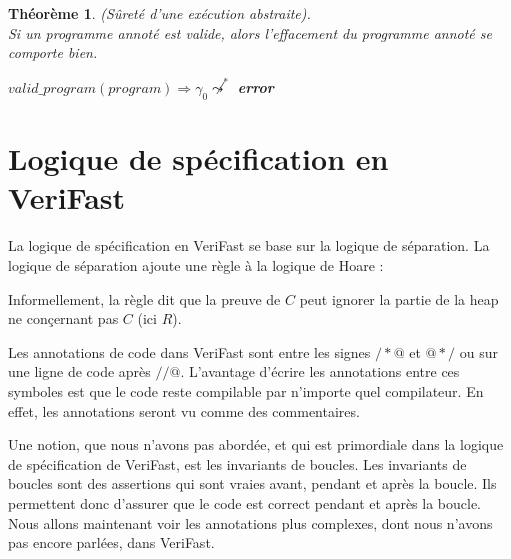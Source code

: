 \documentclass[9pt,openany]{book}
\newcommand{\verifast}{VeriFast}
\newtheorem{theorem}{Th\'eor\`eme}
\begin{document}
		\begin{theorem}
			(S\^uret\'e d'une ex\'ecution abstraite).\\
			Si un programme annot\'e est valide, alors l'effacement du programme annot\'e se comporte bien.
			\begin{center}
			$valid\_program(program)\Rightarrow\gamma_0 \not\leadsto^*$ \textbf{error}
			\end{center}
		\end{theorem}
	
		
	\section{Logique de sp\'ecification en \verifast{}}
		La logique de sp\'ecification en \verifast{} se base sur la logique de s\'eparation. La logique de s\'eparation ajoute une r\`egle \`a la logique de Hoare :
		\begin{center}
		


		\end{center}
		Informellement, la r\`egle dit que la preuve de $C$ peut ignorer la partie de la heap ne con\c{c}ernant pas $C$ (ici $R$).\par
		Les annotations de code dans \verifast{} sont entre les signes $/*@$ et $@*/$ ou sur une ligne de code apr\`es $//@$. L'avantage d'\'ecrire les annotations entre ces symboles est que le code reste compilable par n'importe quel compilateur. En effet, les annotations seront vu comme des commentaires.\par
		Une notion, que nous n'avons pas abord\'ee, et qui est primordiale dans la logique de sp\'ecification de \verifast, est les invariants de boucles. Les invariants de boucles sont des assertions qui sont vraies avant, pendant et apr\`es la boucle. Ils permettent donc d'assurer que le code est correct pendant et apr\`es la boucle. Nous allons maintenant voir les annotations plus complexes, dont nous n'avons pas encore parl\'ees, dans \verifast.
\end{document}
